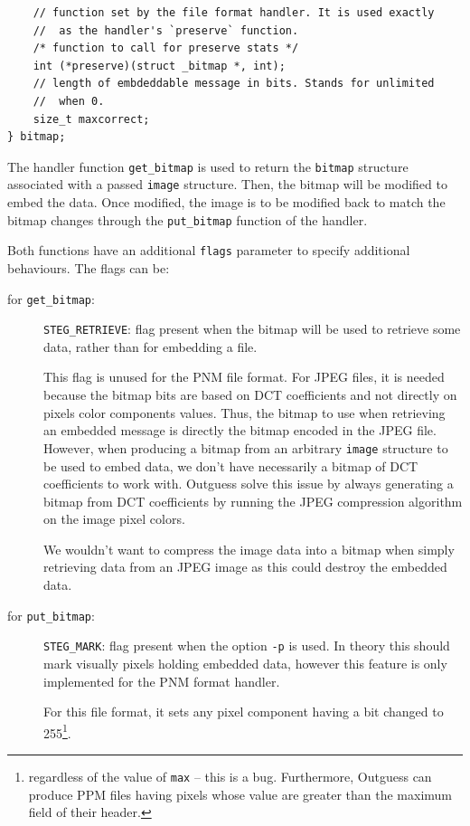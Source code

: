 \documentclass{article}
\begin{document}
\begin{itemize}
\begin{verbatim}
	// function set by the file format handler. It is used exactly
	//  as the handler's `preserve` function.
	/* function to call for preserve stats */
	int (*preserve)(struct _bitmap *, int);
	// length of embdeddable message in bits. Stands for unlimited
	//  when 0.
	size_t maxcorrect;
} bitmap;
		\end{verbatim}

		The handler function \texttt{get\_bitmap} is used to return the \texttt{bitmap} structure associated with a passed \texttt{image} structure. Then, the bitmap will be modified to embed the data. Once modified, the image is to be modified back to match the bitmap changes through the \texttt{put\_bitmap} function of the handler.
		
		Both functions have an additional \texttt{flags} parameter to specify additional behaviours. The flags can be:
		\begin{description}
			\item[for \texttt{get\_bitmap}: ] \texttt{STEG\_RETRIEVE}: flag present when the bitmap will be used to retrieve some data, rather than for embedding a file.
			
				This flag is unused for the PNM file format. For JPEG files, it is needed because the bitmap bits are based on DCT coefficients and not directly on pixels color components values. Thus, the bitmap to use when retrieving an embedded message is directly the bitmap encoded in the JPEG file. However, when producing a bitmap from an arbitrary \texttt{image} structure to be used to embed data, we don't have necessarily a bitmap of DCT coefficients to work with. Outguess solve this issue by always generating a bitmap from DCT coefficients by running the JPEG compression algorithm on the image pixel colors.
				
				We wouldn't want to compress the image data into a bitmap when simply retrieving data from an JPEG image as this could destroy the embedded data.

			\item[for \texttt{put\_bitmap}: ] \texttt{STEG\_MARK}: flag present when the option \texttt{-p} is used. In theory this should mark visually pixels holding embedded data, however this feature is only implemented for the PNM format handler.
			
				For this file format, it sets any pixel component having a bit changed to 255\footnote{regardless of the value of \texttt{max} -- this is a bug. Furthermore, Outguess can produce PPM files having pixels whose value are greater than the maximum field of their header.}.
		\end{description}


\end{itemize}
\end{document}
